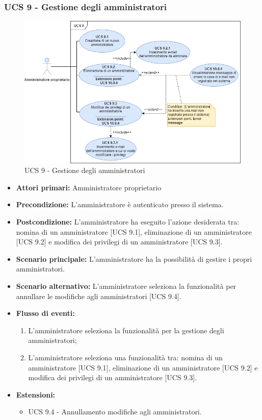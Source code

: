 \subsubsection{UCS 9 - Gestione degli amministratori}%
\begin{figure}[h]
    \centering
      \includegraphics[scale=0.5]{Sezioni/UseCase/Immagini/UCS9.png}
    \caption{UCS 9 - Gestione degli amministratori}
  \end{figure}
\begin{itemize}
\item \textbf{Attori primari:} Amministratore proprietario
\item \textbf{Precondizione:} L'amministratore è autenticato presso il sistema.
\item \textbf{Postcondizione:} L'amministratore ha eseguito l'azione desiderata tra: nomina di un amministratore [UCS 9.1], eliminazione di un amministratore [UCS 9.2] e modifica dei privilegi di un amministratore [UCS 9.3].
\item \textbf{Scenario principale:} L'amministratore ha la possibilità di gestire i propri amministratori.
\item \textbf{Scenario alternativo:} L'amministratore seleziona la funzionalità per annullare le modifiche agli amministratori [UCS 9.4].
\item \textbf{Flusso di eventi:} %
  \begin{enumerate}
        \item L'amministratore seleziona la funzionalità per la gestione degli amministratori;
        \item L'amministratore seleziona una funzionalità tra: nomina di un amministratore [UCS 9.1], eliminazione di un amministratore [UCS 9.2] e modifica dei privilegi di un amministratore [UCS 9.3].
    \end{enumerate}
\item \textbf{Estensioni:}
	\begin{itemize}
		\item UCS 9.4 - Annullamento modifiche agli amministratori.
	\end{itemize}
\end{itemize}



